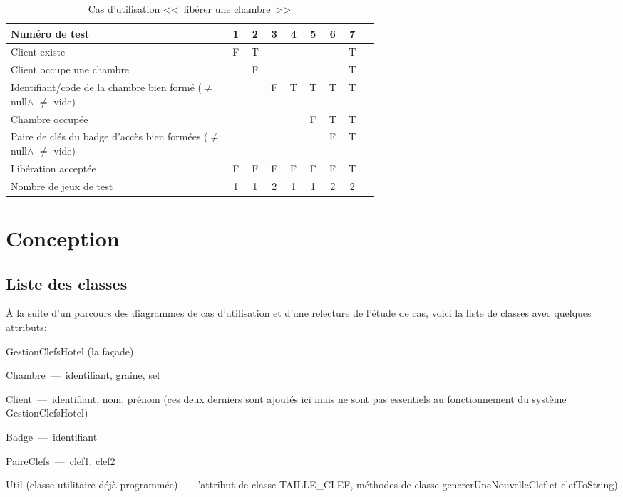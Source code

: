 \documentclass[11pt,article]{article}
\newcommand{\nullvalue}{\textsf{null}\xspace}
\begin{document}
        \begin{table}[htbp!]
            \begin{tabular}{|p{0.6\linewidth}|c|c|c|c|c|c|c|c|}
                \hline
                Numéro de test
                    &1&2&3&4&5&6&7\\
                \hline
                \hline

                Client existe
                    &F&T& & & & &T\\
                \hline
                Client occupe une chambre
                    & &F& & & & &T\\
                \hline
                \hline
                Identifiant/code de la chambre bien formé ($\neq$ \nullvalue $\land$ $\neq$ vide)
                    & & &F&T&T&T&T\\
                \hline
                Chambre occupée
                    & & & & &F&T&T\\
                \hline
                Paire de clés du badge d'accès bien formées ($\neq$ \nullvalue $\land$ $\neq$ vide)
                    & & & & & &F&T\\
                \hline
                \hline                Libération acceptée
                    &F&F&F&F&F&F&T\\
                \hline
                \hline
                Nombre de jeux de test
                    &1&1&2&1&1&2&2 \\
                \hline
            \end{tabular}
            \caption{Cas d'utilisation <<~libérer une chambre~>>}
        \end{table}
\newpage

\section{Conception}

\subsection{Liste des classes}

À la suite d'un parcours des diagrammes de cas d'utilisation et d'une
relecture de l'étude de cas, voici la liste de classes avec quelques
attributs:
\begin{compactitem}
\item \textsf{GestionClefsHotel} (la façade)
\item \textsf{Chambre}~---~identifiant, graine, sel
\item \textsf{Client}~---~identifiant, nom, prénom (ces deux derniers
  sont ajoutés ici mais ne sont pas essentiels au fonctionnement du
  système \textsf{GestionClefsHotel})
\item \textsf{Badge}~---~identifiant
\item \textsf{PaireClefs}~---~clef1, clef2
\item \textsf{Util} (classe utilitaire déjà programmée)~---~'attribut
  de classe \textsf{TAILLE\_CLEF}, méthodes de classe
  \textsf{genererUneNouvelleClef} et \textsf{clefToString})
\end{compactitem}
\newpage
\end{document}
